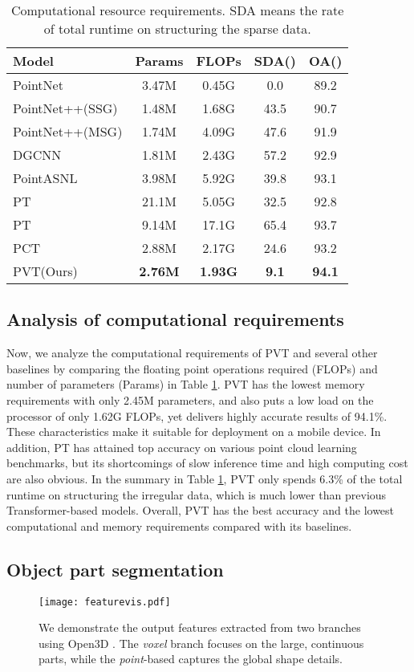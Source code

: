 \documentclass[10pt,twocolumn,letterpaper]{article}
\begin{document}
\begin{table}  
\centering
\begin{center} 
\begin{tabular}{|l|cccc|}   
\hline
Model & Params & FLOPs & SDA() & OA()\\
\hline
PointNet & 3.47M & 0.45G & 0.0 & 89.2  \\
PointNet++(SSG) & 1.48M & 1.68G &43.5& 90.7\\
PointNet++(MSG) & 1.74M & 4.09G &47.6& 91.9  \\
DGCNN  & 1.81M & 2.43G &57.2& 92.9 \\
\hline
PointASNL  & 3.98M & 5.92G &39.8& 93.1 \\
PT  & 21.1M & 5.05G &32.5& 92.8\\
PT  & 9.14M & 17.1G &65.4 & 93.7\\
PCT & 2.88M & 2.17G&24.6& 93.2\\
PVT(Ours) & \textbf{2.76M}& \textbf{1.93G} & \textbf{9.1} &  \textbf{94.1}\\
\hline
\end{tabular}  
\end{center}  
\caption{Computational resource requirements. SDA means the rate of total runtime on structuring the sparse data.}
\label{computational}
\end{table} 
\subsection{Analysis of computational requirements}
Now, we analyze the computational requirements of PVT and several other baselines by comparing the floating point operations required (FLOPs) and number of parameters (Params) in Table \ref{computational}. PVT has the lowest memory requirements with only 2.45M parameters, and also puts a low load on the processor of only 1.62G FLOPs, yet delivers highly accurate results of 94.1\%. These characteristics
make it suitable for deployment on a mobile device. In addition, PT has attained top accuracy on various point cloud learning benchmarks, but its shortcomings of slow inference time and high computing cost are also obvious.
In the summary in Table \ref{computational}, PVT only spends 6.3\% of the total runtime on structuring the irregular data, which is much lower than previous Transformer-based models. 
Overall, PVT has the best accuracy and the lowest computational and memory requirements compared with its baselines. 
\subsection{Object part segmentation}
\begin{figure*}
    \centering
     \texttt{[image: featurevis.pdf]}
    \caption{We demonstrate the output features extracted from two branches using Open3D \cite{open3d}. The \emph{voxel} branch focuses on the large, continuous parts, while the \emph{point}-based captures the global shape details.}
    \label{fig:disentangle}
\end{figure*}
\end{document}
